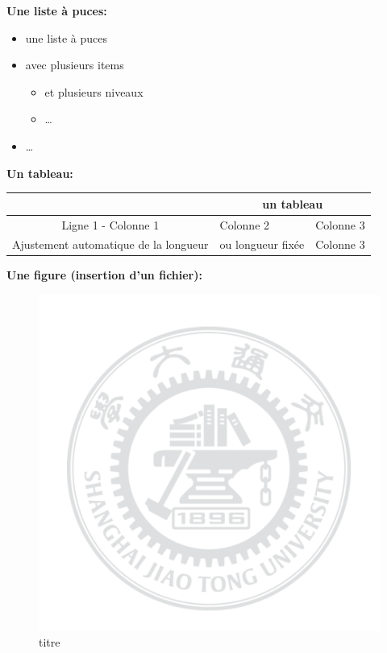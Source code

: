 \documentclass[a4paper,12pt]{article}
\begin{document}
\medskip

\textbf{Une liste à puces:}
\begin{itemize}
\item une liste à puces
\item avec plusieurs items
\begin{itemize}
\item et plusieurs niveaux
\item \dots
\end{itemize}
\item \dots
\end{itemize}

\pagebreak

\textbf{Un tableau:}
\begin{center}
\begin{tabular}{|c|p{.1\linewidth}| r|}
\cline{2-3}  \multicolumn{1}{c}{} & \multicolumn{2}{|c|}{un tableau} \\
\hline Ligne 1 - Colonne 1 & Colonne 2 & Colonne 3 \\
\hline Ajustement automatique de la longueur & ou longueur fixée & Colonne 3 \\
\hline
\end{tabular}
\end{center}

\textbf{Une figure (insertion d'un fichier):}
\begin{figure}[h]
\begin{center}
\includegraphics[scale=0.5]{Image/sjtu2}
\end{center}
\caption{\label{fig1}titre}
\end{figure}
\end{document}
